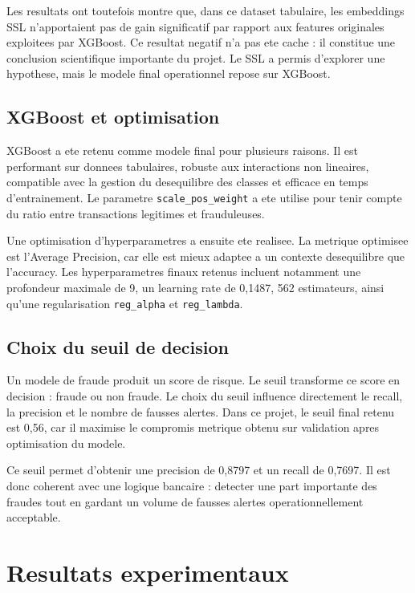 ﻿\documentclass[12pt,a4paper,oneside]{report}
\begin{document}
Les resultats ont toutefois montre que, dans ce dataset tabulaire, les embeddings SSL n'apportaient pas de gain significatif par rapport aux features originales exploitees par XGBoost. Ce resultat negatif n'a pas ete cache : il constitue une conclusion scientifique importante du projet. Le SSL a permis d'explorer une hypothese, mais le modele final operationnel repose sur XGBoost.

\section{XGBoost et optimisation}

XGBoost a ete retenu comme modele final pour plusieurs raisons. Il est performant sur donnees tabulaires, robuste aux interactions non lineaires, compatible avec la gestion du desequilibre des classes et efficace en temps d'entrainement. Le parametre \texttt{scale\_pos\_weight} a ete utilise pour tenir compte du ratio entre transactions legitimes et frauduleuses.

Une optimisation d'hyperparametres a ensuite ete realisee. La metrique optimisee est l'Average Precision, car elle est mieux adaptee a un contexte desequilibre que l'accuracy. Les hyperparametres finaux retenus incluent notamment une profondeur maximale de 9, un learning rate de 0,1487, 562 estimateurs, ainsi qu'une regularisation \texttt{reg\_alpha} et \texttt{reg\_lambda}.

\section{Choix du seuil de decision}

Un modele de fraude produit un score de risque. Le seuil transforme ce score en decision : fraude ou non fraude. Le choix du seuil influence directement le recall, la precision et le nombre de fausses alertes. Dans ce projet, le seuil final retenu est 0,56, car il maximise le compromis metrique obtenu sur validation apres optimisation du modele.

Ce seuil permet d'obtenir une precision de 0,8797 et un recall de 0,7697. Il est donc coherent avec une logique bancaire : detecter une part importante des fraudes tout en gardant un volume de fausses alertes operationnellement acceptable.

\chapter{Resultats experimentaux}
\end{document}
